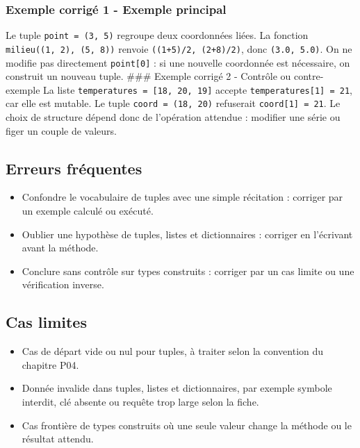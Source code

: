 \subsubsection{Exemple corrigé 1 - Exemple principal}

Le tuple \texttt{point\ =\ (3,\ 5)} regroupe deux coordonnées liées. La
fonction \texttt{milieu((1,\ 2),\ (5,\ 8))} renvoie
\texttt{((1+5)/2,\ (2+8)/2)}, donc \texttt{(3.0,\ 5.0)}. On ne modifie
pas directement \texttt{point{[}0{]}} : si une nouvelle coordonnée est
nécessaire, on construit un nouveau tuple. \#\#\# Exemple corrigé 2 -
Contrôle ou contre-exemple La liste
\texttt{temperatures\ =\ {[}18,\ 20,\ 19{]}} accepte
\texttt{temperatures{[}1{]}\ =\ 21}, car elle est mutable. Le tuple
\texttt{coord\ =\ (18,\ 20)} refuserait \texttt{coord{[}1{]}\ =\ 21}. Le
choix de structure dépend donc de l'opération attendue : modifier une
série ou figer un couple de valeurs.

\subsection{Erreurs fréquentes}

\begin{itemize}
\tightlist
\item
  Confondre le vocabulaire de tuples avec une simple récitation :
  corriger par un exemple calculé ou exécuté.
\item
  Oublier une hypothèse de tuples, listes et dictionnaires : corriger en
  l'écrivant avant la méthode.
\item
  Conclure sans contrôle sur types construits : corriger par un cas
  limite ou une vérification inverse.
\end{itemize}

\subsection{Cas limites}

\begin{itemize}
\tightlist
\item
  Cas de départ vide ou nul pour tuples, à traiter selon la convention
  du chapitre P04.
\item
  Donnée invalide dans tuples, listes et dictionnaires, par exemple
  symbole interdit, clé absente ou requête trop large selon la fiche.
\item
  Cas frontière de types construits où une seule valeur change la
  méthode ou le résultat attendu.
\end{itemize}

